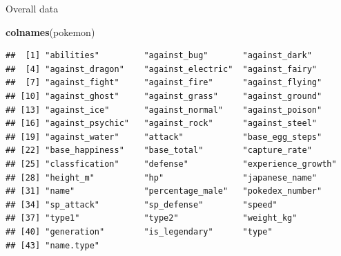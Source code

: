 \documentclass[
  ignorenonframetext,
]{beamer}
\newenvironment{Shaded}{\begin{snugshade}}{\end{snugshade}}
\newcommand{\KeywordTok}[1]{\textcolor[rgb]{0.13,0.29,0.53}{\textbf{#1}}}
\newcommand{\NormalTok}[1]{#1}
\begin{document}
\begin{frame}[fragile]{Overall data}
\protect\hypertarget{overall-data}{}

\begin{Shaded}
\begin{Highlighting}[]
\KeywordTok{colnames}\NormalTok{(pokemon)}
\end{Highlighting}
\end{Shaded}

\begin{verbatim}
##  [1] "abilities"         "against_bug"       "against_dark"     
##  [4] "against_dragon"    "against_electric"  "against_fairy"    
##  [7] "against_fight"     "against_fire"      "against_flying"   
## [10] "against_ghost"     "against_grass"     "against_ground"   
## [13] "against_ice"       "against_normal"    "against_poison"   
## [16] "against_psychic"   "against_rock"      "against_steel"    
## [19] "against_water"     "attack"            "base_egg_steps"   
## [22] "base_happiness"    "base_total"        "capture_rate"     
## [25] "classfication"     "defense"           "experience_growth"
## [28] "height_m"          "hp"                "japanese_name"    
## [31] "name"              "percentage_male"   "pokedex_number"   
## [34] "sp_attack"         "sp_defense"        "speed"            
## [37] "type1"             "type2"             "weight_kg"        
## [40] "generation"        "is_legendary"      "type"             
## [43] "name.type"
\end{verbatim}

\end{frame}
\end{document}
